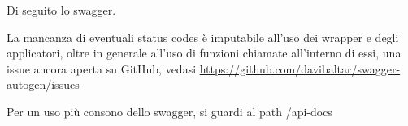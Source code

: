 Di seguito lo swagger.

\alert{La mancanza di eventuali status codes è imputabile all'uso dei wrapper e degli applicatori, oltre in generale all'uso di funzioni chiamate all'interno di essi, una issue ancora aperta su GitHub, vedasi \url{https://github.com/davibaltar/swagger-autogen/issues}}

\alert{Per un uso più consono dello swagger, si guardi al path /api-docs}

